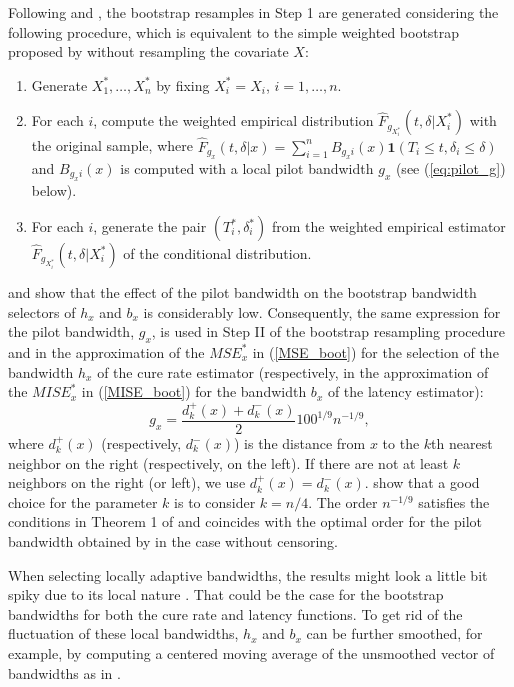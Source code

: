 Following \cite{Lopez1} and \cite{Lopez2}, the bootstrap resamples in Step 1 are generated considering the following procedure, which is equivalent to the simple weighted bootstrap proposed by \cite{Li2} without resampling the covariate $X$:
\begin{enumerate}[label=\Roman*.]
\item Generate $X_1^*,\ldots,X_n^*$ by fixing $X_i^*=X_i$, $i=1,\ldots,n$.
\item For each $i$, compute the weighted empirical distribution $\hat F_{g_{X_i^*}}\left (t,\delta|X_i^* \right)$ with the original sample, where $\hat F_{g_x}\left(t,\delta|x \right)=\sum_{i=1}^n B_{g_xi}(x)\mathbf{1}\left (T_i\leq t, \delta_i \leq \delta \right)$ and $B_{g_xi}(x)$ is computed with a local pilot bandwidth $g_x$ (see (\ref{eq:pilot_g}) below).
\item For each $i$, generate the pair $\left (T_i^*, \delta_i^* \right)$ from the weighted empirical estimator $\hat F_{g_{X_i^*}}\left(t,\delta|X_i^* \right)$ of the conditional distribution.
\end{enumerate}

\cite{Lopez1} and \cite{Lopez2} show that the effect of the pilot bandwidth on the bootstrap bandwidth selectors of $h_x$ and $b_x$ is considerably low. Consequently, the same expression for the pilot bandwidth, $g_x$, is used in Step II of the bootstrap resampling procedure and in the approximation of the $MSE^*_x$ in (\ref{MSE_boot}) for the selection of the bandwidth $h_x$ of the cure rate estimator (respectively, in the approximation of the $MISE^*_x$ in (\ref{MISE_boot}) for the bandwidth $b_x$ of the latency estimator):
\begin{equation}
g_x = \frac{d_k^+(x) + d_k^-(x)}{2} 100^{1/9} n^{-1/9},
\label{eq:pilot_g}
\end{equation}
where $d_k^+(x)$ (respectively, $d_k^-(x)$) is the distance from $x$ to the $k$th nearest neighbor on the right (respectively, on the left). If there are not at least $k$ neighbors on the right (or left), we use $d_k^+(x)=d_k^-(x)$. \cite{Lopez1} show that a good choice for the parameter $k$ is to consider $k = n/4$. The order $n^{-1/9}$ satisfies the conditions in Theorem 1 of \cite{Li2} and coincides with the optimal order for the pilot bandwidth obtained by \cite{Cao} in the case without censoring.

When selecting locally adaptive bandwidths, the results might look a little bit spiky due to its local nature \citep[see, e.g.,][on local bandwidth selection for kernel regression estimators]{Brockmann}. That could be the case for the bootstrap bandwidths for both the cure rate and latency functions. To get rid of the fluctuation of these local bandwidths, $h_x$ and $b_x$ can be further smoothed, for example, by computing a centered moving average of the unsmoothed vector of bandwidths as in \cite{Lopez1}.


